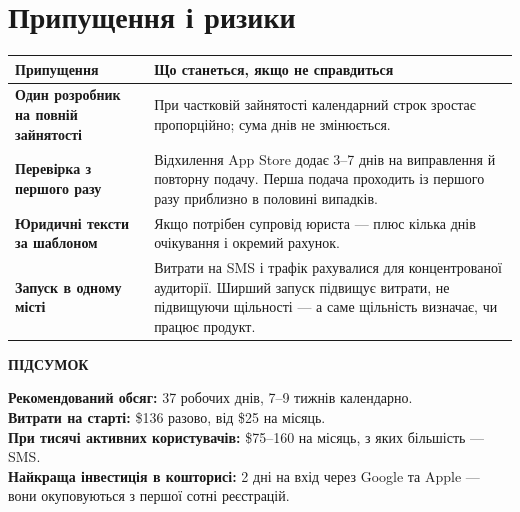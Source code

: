 \documentclass[11pt,a4paper]{article}
\newcommand{\thead}[1]{{\color{muted}\footnotesize\bfseries #1}}
\newcommand{\notelbl}[2]{{\color{#1}\footnotesize\bfseries\MakeUppercase{#2}}\par\vspace{3pt}}
\begin{document}
\section{Припущення і ризики}

\begin{xltabular}{\textwidth}{N{5.4cm} Y}
\toprule
\thead{Припущення} & \thead{Що станеться, якщо не справдиться} \\
\midrule
\textbf{Один розробник на повній зайнятості} &
При частковій зайнятості календарний строк зростає пропорційно;
сума днів не змінюється. \\

\textbf{Перевірка з першого разу} &
Відхилення App Store додає 3--7 днів на виправлення й повторну подачу.
Перша подача проходить із першого разу приблизно в половині випадків. \\

\textbf{Юридичні тексти за шаблоном} &
Якщо потрібен супровід юриста --- плюс кілька днів очікування і окремий
рахунок. \\

\textbf{Запуск в одному місті} &
Витрати на SMS і трафік рахувалися для концентрованої аудиторії. Ширший
запуск підвищує витрати, не підвищуючи щільності --- а саме щільність
визначає, чи працює продукт. \\
\bottomrule
\end{xltabular}

\vspace{12pt}

\begin{notepos}
\notelbl{accent}{Підсумок}
\textbf{Рекомендований обсяг:} 37 робочих днів, 7--9 тижнів календарно.\\
\textbf{Витрати на старті:} \$136 разово, від \$25 на місяць.\\
\textbf{При тисячі активних користувачів:} \$75--160 на місяць, з яких
більшість --- SMS.\\
\textbf{Найкраща інвестиція в кошторисі:} 2 дні на вхід через Google та Apple ---
вони окуповуються з першої сотні реєстрацій.
\end{notepos}
\end{document}
